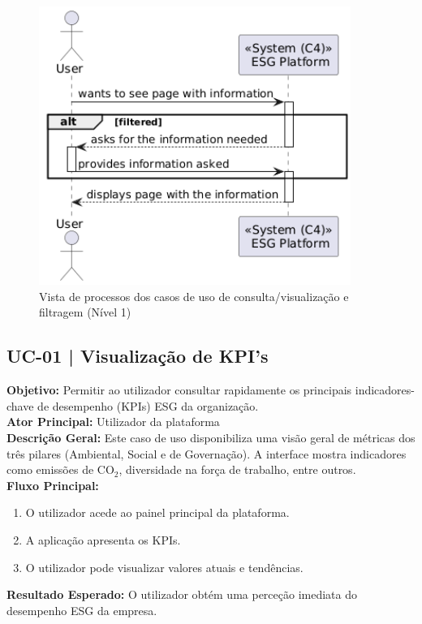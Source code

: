 \begin{figure}[h]
\centering
\includegraphics[width=4in]{frontmatter/assets/diagrams/Process Views/UC12345-lvl1.png}
\caption{Vista de processos dos casos de uso de consulta/visualização e filtragem (Nível 1)}
\label{fig:UC12345-lvl1}
\end{figure}


\subsection{UC-01 | Visualização de KPI's}

\textbf{Objetivo:} Permitir ao utilizador consultar rapidamente os principais indicadores-chave de desempenho (KPIs) ESG da organização. \\
\textbf{Ator Principal:} Utilizador da plataforma \\
\textbf{Descrição Geral:} Este caso de uso disponibiliza uma visão geral de métricas dos três pilares (Ambiental, Social e de Governação). A interface mostra indicadores como emissões de CO$_2$, diversidade na força de trabalho, entre outros. \\
\textbf{Fluxo Principal:}
\begin{enumerate}
    \item O utilizador acede ao painel principal da plataforma.
    \item A aplicação apresenta os KPIs.
    \item O utilizador pode visualizar valores atuais e tendências.
\end{enumerate}
\textbf{Resultado Esperado:} O utilizador obtém uma perceção imediata do desempenho ESG da empresa.

